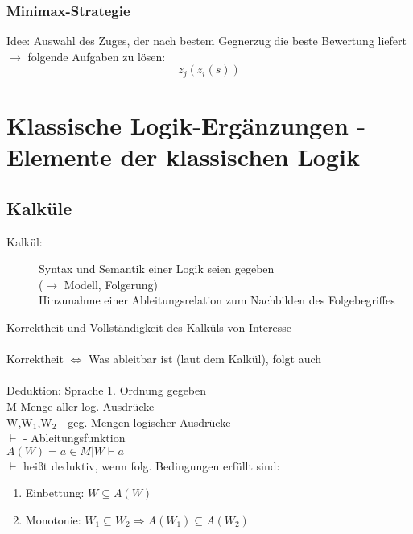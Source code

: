 \documentclass[a4paper,14pt]{article}
\begin{document}
\subsubsection{Minimax-Strategie}
Idee: Auswahl des Zuges, der nach bestem Gegnerzug die beste Bewertung liefert\\
$\rightarrow$ folgende Aufgaben zu lösen:
$$z_j(z_i(s)) $$

\section{Klassische Logik-Ergänzungen - Elemente der klassischen Logik}
\subsection{Kalküle}
\begin{description}
 \item[Kalkül:] Syntax und Semantik einer Logik seien gegeben\\ ($\rightarrow$ Modell,  Folgerung)\\
		Hinzunahme einer Ableitungsrelation zum Nachbilden des Folgebegriffes
\end{description}

Korrektheit und Vollständigkeit des Kalküls von Interesse\\
\\
Korrektheit $\Leftrightarrow$ Was ableitbar ist (laut dem Kalkül), folgt auch\\
\\
Deduktion: Sprache 1. Ordnung gegeben\\
M-Menge aller log. Ausdrücke\\
W,W$_1$,W$_2$ - geg. Mengen logischer Ausdrücke\\
$\vdash$ -  Ableitungsfunktion\\
$A(W) = {a\in M | W \vdash a}$\\
$\vdash$ heißt deduktiv, wenn folg. Bedingungen erfüllt sind:
\begin{enumerate}
 \item Einbettung: $W\subseteq A(W)$
 \item Monotonie: $W_1\subseteq W_2 \Rightarrow A(W_1) \subseteq A(W_2)$
\end{enumerate}
\end{document}
